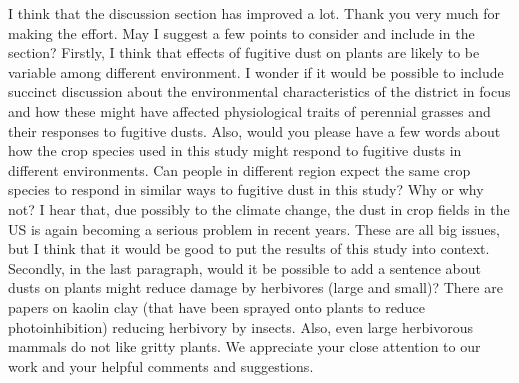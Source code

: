 \documentclass[parskip=half]{scrartcl}
\newcommand{\AR}[1]
	{\color{PineGreen}#1\color{black} \par }
\begin{document}
I think that the discussion section has improved a lot.
Thank you very much for making the effort.
May I suggest a few points to consider and include in the section?
Firstly, I think that effects of fugitive dust on plants are likely to be variable among different environment. 
I wonder if it would be possible to include succinct discussion about the environmental characteristics of the district in focus and how these might have affected physiological traits of perennial grasses and their responses to fugitive dusts.  Also, would you please have a few words about how the crop species used in this study might respond to fugitive dusts in different environments.  Can people in different region expect the same crop species to respond in similar ways to fugitive dust in this study?  Why or why not?  I hear that, due possibly to the climate change, the dust in crop fields in the US is again becoming a serious problem in recent years.  These are all big issues, but I think that it would be good to put the results of this study into context.
Secondly, in the last paragraph, would it be possible to add a sentence about dusts on plants might reduce damage by herbivores (large and small)?  There are papers on kaolin clay (that have been sprayed onto plants to reduce photoinhibition) reducing herbivory by insects.  Also, even large herbivorous mammals do not like gritty plants.
\AR{We appreciate your close attention to our work and your helpful comments and suggestions.}
\end{document}
